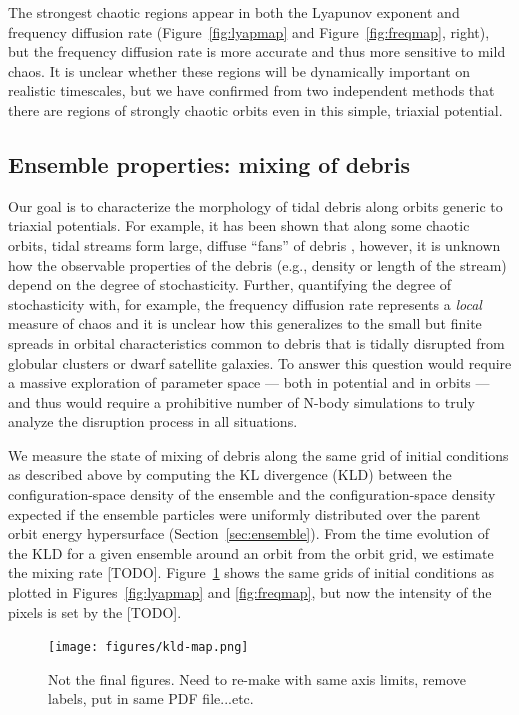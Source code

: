 \documentclass[letterpaper,12pt,preprint]{aastex}
\begin{document}
The strongest chaotic regions appear in both the Lyapunov exponent and frequency diffusion rate (Figure~\ref{fig:lyapmap} and Figure~\ref{fig:freqmap}, right), but the frequency diffusion rate is more accurate and thus more sensitive to mild chaos. It is unclear whether these regions will be dynamically important on realistic timescales, but we have confirmed from two independent methods that there are regions of strongly chaotic orbits even in this simple, triaxial potential.

\subsection{Ensemble properties: mixing of debris}

Our goal is to characterize the morphology of tidal debris along orbits generic to triaxial potentials. For example, it has been shown that along some chaotic orbits, tidal streams form large, diffuse ``fans'' of debris \citep[e.g.][]{fardal14, pearson15}, however, it is unknown how the observable properties of the debris (e.g., density or length of the stream) depend on the degree of stochasticity. Further, quantifying the degree of stochasticity with, for example, the frequency diffusion rate represents a \emph{local} measure of chaos and it is unclear how this generalizes to the small but finite spreads in orbital characteristics common to debris that is tidally disrupted from globular clusters or dwarf satellite galaxies. To answer this question would require a massive exploration of parameter space --- both in potential and in orbits --- and thus would require a prohibitive number of N-body simulations to truly analyze the disruption process in all situations.

We measure the state of mixing of debris along the same grid of initial conditions as described above by computing the KL divergence (KLD) between the configuration-space density of the ensemble and the configuration-space density expected if the ensemble particles were uniformly distributed over the parent orbit energy hypersurface (Section~\ref{sec:ensemble}). From the time evolution of the KLD for a given ensemble around an orbit from the orbit grid, we estimate the mixing rate [TODO]. Figure~\ref{fig:kldmap} shows the same grids of initial conditions as plotted in Figures~\ref{fig:lyapmap} and \ref{fig:freqmap}, but now the intensity of the pixels is set by the [TODO].

\begin{figure}[!h]
\centering
	\texttt{[image: figures/kld-map.png]}
	\caption{Not the final figures. Need to re-make with same axis limits, remove labels, put in same PDF file...etc.} 
	\label{fig:kldmap}
\end{figure}
\end{document}
